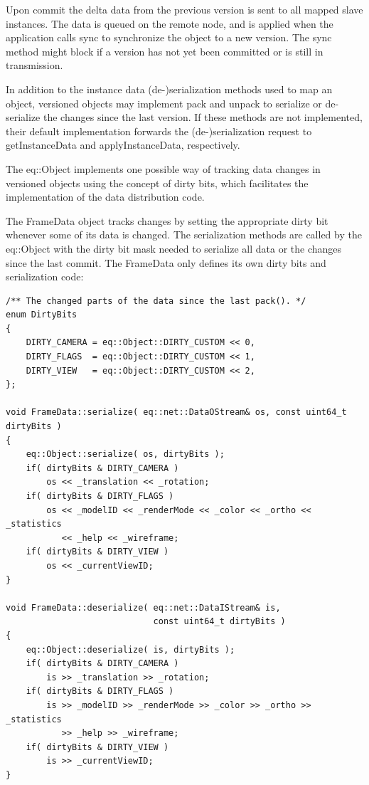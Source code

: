 \documentclass[10pt,a4]{scrartcl}
\begin{document}
Upon \textsf{commit} the delta data from the previous version is sent to
all mapped slave instances. The data is queued on the remote node, and
is applied when the application calls \textsf{sync} to synchronize the
object to a new version. The \textsf{sync} method might block if a
version has not yet been committed or is still in transmission.

In addition to the instance data (de-)serialization methods used to map
an object, versioned objects may implement \textsf{pack} and
\textsf{unpack} to serialize or de-serialize the changes since the last
version. If these methods are not implemented, their default
implementation forwards the (de-)serialization request to
\textsf{getInstanceData} and \textsf{applyInstanceData}, respectively.

The \textsf{eq::Object} implements one possible way of tracking data
changes in versioned objects using the concept of dirty bits, which
facilitates the implementation of the data distribution code. 

The \textsf{FrameData} object tracks changes by setting the appropriate
dirty bit whenever some of its data is changed. The serialization
methods are called by the \textsf{eq::Object} with the dirty bit mask
needed to serialize all data or the changes since the last
\textsf{commit}. The \textsf{FrameData} only defines its own dirty bits
and serialization code:

{\footnotesize\begin{lstlisting}
/** The changed parts of the data since the last pack(). */
enum DirtyBits
{
    DIRTY_CAMERA = eq::Object::DIRTY_CUSTOM << 0,
    DIRTY_FLAGS  = eq::Object::DIRTY_CUSTOM << 1,
    DIRTY_VIEW   = eq::Object::DIRTY_CUSTOM << 2,
};

void FrameData::serialize( eq::net::DataOStream& os, const uint64_t dirtyBits )
{
    eq::Object::serialize( os, dirtyBits );
    if( dirtyBits & DIRTY_CAMERA )
        os << _translation << _rotation;
    if( dirtyBits & DIRTY_FLAGS )
        os << _modelID << _renderMode << _color << _ortho << _statistics
           << _help << _wireframe;
    if( dirtyBits & DIRTY_VIEW )
        os << _currentViewID;
}

void FrameData::deserialize( eq::net::DataIStream& is,
                             const uint64_t dirtyBits )
{
    eq::Object::deserialize( is, dirtyBits );
    if( dirtyBits & DIRTY_CAMERA )
        is >> _translation >> _rotation;
    if( dirtyBits & DIRTY_FLAGS )
        is >> _modelID >> _renderMode >> _color >> _ortho >> _statistics
           >> _help >> _wireframe;
    if( dirtyBits & DIRTY_VIEW )
        is >> _currentViewID;
}
\end{lstlisting}}%
\end{document}
